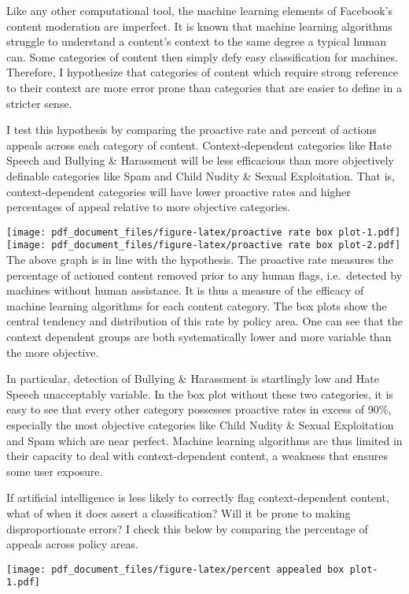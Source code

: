 \documentclass[
]{article}
\begin{document}
Like any other computational tool, the machine learning elements of
Facebook's content moderation are imperfect. It is known that machine
learning algorithms struggle to understand a content's context to the
same degree a typical human can. Some categories of content then simply
defy easy classification for machines. Therefore, I hypothesize that
categories of content which require strong reference to their context
are more error prone than categories that are easier to define in a
stricter sense.

I test this hypothesis by comparing the proactive rate and percent of
actions appeals across each category of content. Context-dependent
categories like Hate Speech and Bullying \& Harassment will be less
efficacious than more objectively definable categories like Spam and
Child Nudity \& Sexual Exploitation. That is, context-dependent
categories will have lower proactive rates and higher percentages of
appeal relative to more objective categories.

\texttt{[image: pdf\_document\_files/figure-latex/proactive rate box plot-1.pdf]}
\texttt{[image: pdf\_document\_files/figure-latex/proactive rate box plot-2.pdf]}
The above graph is in line with the hypothesis. The proactive rate
measures the percentage of actioned content removed prior to any human
flags, i.e.~detected by machines without human assistance. It is thus a
measure of the efficacy of machine learning algorithms for each content
category. The box plots show the central tendency and distribution of
this rate by policy area. One can see that the context dependent groups
are both systematically lower and more variable than the more objective.

In particular, detection of Bullying \& Harassment is startlingly low
and Hate Speech unacceptably variable. In the box plot without these two
categories, it is easy to see that every other category possesses
proactive rates in excess of 90\%, especially the most objective
categories like Child Nudity \& Sexual Exploitation and Spam which are
near perfect. Machine learning algorithms are thus limited in their
capacity to deal with context-dependent content, a weakness that ensures
some user exposure.

If artificial intelligence is less likely to correctly flag
context-dependent content, what of when it does assert a classification?
Will it be prone to making disproportionate errors? I check this below
by comparing the percentage of appeals across policy areas.

\texttt{[image: pdf\_document\_files/figure-latex/percent appealed box plot-1.pdf]}
\end{document}
